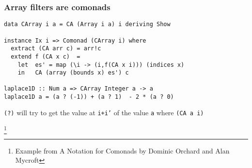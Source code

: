 \documentclass{beamer} %
\newcommand\blfootnote[1]{%
  \begingroup
  \renewcommand\thefootnote{}\footnote{#1}%
  \addtocounter{footnote}{-1}%
  \endgroup
}
\begin{document}
\begin{frame}[fragile]\frametitle{Array filters are comonads}

\begin{verbatim}
data CArray i a = CA (Array i a) i deriving Show

instance Ix i => Comonad (CArray i) where
  extract (CA arr c) = arr!c
  extend f (CA x c)  =
    let  es' = map (\i -> (i,f(CA x i))) (indices x)
    in   CA (array (bounds x) es') c

laplace1D :: Num a => CArray Integer a -> a
laplace1D a = (a ? (-1)) + (a ? 1)  - 2 * (a ? 0)
\end{verbatim}
\texttt{(?)} will try to get the value at \texttt{i+i'} of the value \texttt{a} 
where \texttt{(CA a i)} 

\blfootnote{Example from A Notation for Comonads by Dominic Orchard and Alan Mycroft}
\end{frame}
\end{document}
